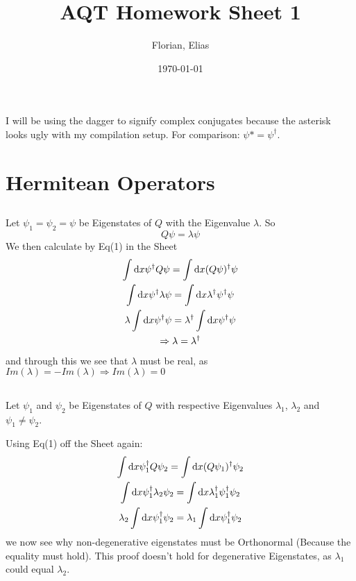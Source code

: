 \documentclass[]{scrartcl}
\title{AQT Homework Sheet 1}
\author{Florian, Elias}
\date{\today}
\begin{document}
\maketitle
\newpage
\tableofcontents
\newpage
I will be using the dagger to signify complex conjugates because the asterisk looks ugly with my compilation setup. For comparison: $\psi* = \psi^\dagger$.
\section{Hermitean Operators}
\subsection{}
Let $\psi_1 = \psi_2 = \psi$ be Eigenstates of $Q$ with the Eigenvalue $\lambda$. So
$$
Q\psi = \lambda\psi
$$
We then calculate by Eq(1) in the Sheet
\begin{gather}
	\int \text d x \psi^\dagger Q\psi = \int \text d x (Q\psi)^\dagger\psi\\
	\int \text d x \psi^\dagger \lambda \psi = \int \text d x \lambda^\dagger\psi^\dagger\psi\\
	\lambda \int\text dx \psi^\dagger\psi = \lambda^\dagger \int\text dx\psi^\dagger\psi\\
	\Rightarrow \lambda = \lambda^\dagger
\end{gather}
and through this we see that $\lambda$ must be real, as $Im(\lambda) = -Im(\lambda) \Rightarrow Im(\lambda) = 0$
\subsection{}
Let $\psi_1$ and $\psi_2$ be Eigenstates of $Q$ with respective Eigenvalues $\lambda_1$, $\lambda_2$ and $\psi_1 \neq \psi_2$.

Using Eq(1) off the Sheet again:
\begin{gather}
	\int \text dx \psi_1^\dagger Q\psi_2 = \int \text dx (Q\psi_1)^\dagger\psi_2\\
	\int \text dx \psi_1^\dagger \lambda_2 \psi_2 = \int \text dx \lambda_1^\dagger \psi_1^\dagger \psi_2\\
	\lambda_2 \int\text dx \psi_1^\dagger \psi_2 = \lambda_1 \int \text dx \psi_1^\dagger \psi_2
\end{gather}
we now see why non-degenerative eigenstates must be Orthonormal (Because the equality must hold). This proof doesn't hold for degenerative Eigenstates, as $\lambda_1$ could equal $\lambda_2$.
\end{document}
